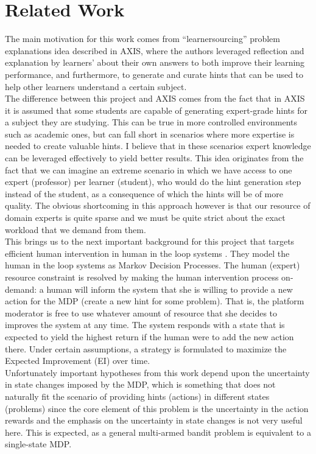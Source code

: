 \documentclass[conference]{IEEEtran}
\begin{document}
	\section{Related Work}
		The main motivation for this work comes from ``learnersourcing'' problem explanations idea described in 
		AXIS\cite{AXIS}, where the authors leveraged reflection and explanation by learners' about their own
		answers to both improve their learning performance, and furthermore, to generate and curate hints that
		can be used to help other learners understand a certain subject.\\
		The difference between this project and AXIS comes from the fact that in AXIS it is assumed that some
		students are capable of generating expert-grade hints for a subject they are studying. This can be true
		in more controlled environments such as academic ones, but can fall short in scenarios where more expertise
		is needed to create valuable hints. I believe that in these scenarios expert knowledge can be leveraged
		effectively to yield better results. This idea originates from the fact that we can imagine an extreme
		scenario in which we have access to one expert (professor) per learner (student), who would do the hint
		generation step instead of the student, as a consequence of which the hints will be of more quality.
		The obvious shortcoming in this approach however is that our resource of domain experts is quite sparse
		and we must be quite strict about the exact workload that we demand from them.\\
		
		This brings us to the next important background for this project that targets efficient human intervention
		in human in the loop systems \cite{HumanInTheLoop}. They model the human in the loop systems as Markov
		Decision Processes. The human (expert) resource constraint is resolved by making the human intervention
		process on-demand: a human will inform the system that she is willing to provide a new action for the MDP
		(create a new hint for some problem). That is, the platform moderator is free to use whatever amount of 
		resource that she decides to improves the system at any time. The system responds with a state that is 
		expected to yield the highest return if the human were to add the new action there. Under certain
		assumptions, a strategy is formulated to maximize the Expected Improvement (\textsc{EI}) over time.\\
		Unfortunately important hypotheses from this work depend upon the uncertainty in state changes imposed by
		the MDP, which is something that does not naturally fit the scenario of providing hints (actions) in
		different states (problems) since the core element of this problem is the uncertainty in the action rewards
		and the emphasis on the uncertainty in state changes is not very useful here. This is expected, as
		a general multi-armed bandit problem is equivalent to a single-state MDP.
\end{document}
